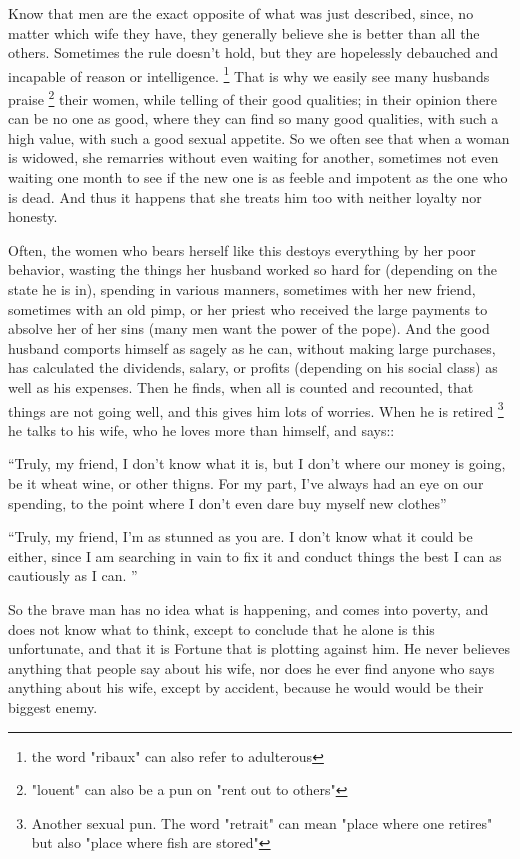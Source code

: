 \documentclass{book}
\begin{document}
Know that men are the exact opposite of what was just described, since, no matter which wife they have, they generally believe she is better than all the others. Sometimes the rule doesn't hold, but they are hopelessly debauched and incapable of reason or intelligence.
\footnote{the word "ribaux" can also refer to adulterous}
That is why we easily see many husbands praise
\footnote{"louent" can also be a pun on "rent out to others"}
their women, while telling of their good qualities; in their opinion there can be no one as good, where they can find so many good qualities, with such a high value, with such a good sexual appetite. So we often see that when a woman is widowed, she remarries without even waiting for another, sometimes not even waiting one month to see if the new one is as feeble and impotent as the one who is dead. And thus it happens that she treats him too with neither loyalty nor honesty. 

Often, the women who bears herself like this destoys everything by her poor behavior, wasting the things her husband worked so hard for (depending on the state he is in), spending in various manners, sometimes with her new friend, sometimes with an old pimp, or her priest who received the large payments to absolve her of her sins (many men want the power of the pope). And the good husband comports himself as sagely as he can, without making large purchases, has calculated the dividends, salary, or profits (depending on his social class) as well as his expenses. Then he finds, when all is counted and recounted, that things are not going well, and this gives him lots of worries. When he is retired
\footnote{Another sexual pun. The word "retrait" can mean "place where one retires" but also "place where fish are stored"}
he talks to his wife, who he loves more than himself, and says::

``Truly, my friend, I don't know what it is, but I don't where our money is going, be it wheat wine, or other thigns. For my part, I've always had an eye on our spending, to the point where I don't even dare buy myself new clothes''

``Truly, my friend, I'm as stunned as you are. I don't know what it could be either, since I am searching in vain to fix it and conduct things the best I can as cautiously as I can. ''


So the brave man has no idea what is happening, and comes into poverty, and does not know what to think, except to conclude that he alone is this unfortunate, and that it is Fortune that is plotting against him. He never believes anything that people say about his wife, nor does he ever find anyone who says anything about his wife, except by accident, because he would would be their biggest enemy. 
\end{document}

